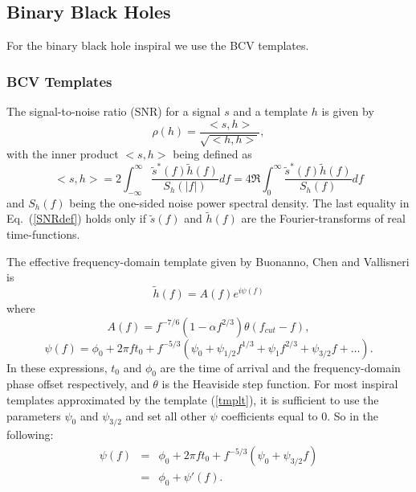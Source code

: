 \subsection*{Binary Black Holes}

For the binary black hole inspiral we use the BCV templates.

\subsubsection*{BCV Templates}
\label{BCV}

The signal-to-noise ratio (SNR) for a signal $s$ and a template $h$ is given by
\begin{equation}
\rho(h) = \frac{<s,h>}{\sqrt{<h,h>}},
\end{equation}
with the inner product $<s,h>$ being defined as
\begin{equation}
<s,h> = 2 \int_{-\infty}^{\infty} \frac{\tilde{s}^{\ast}(f) \tilde{h}(f)}
{S_h(|f|)} df =
4 \Re \int_0^{\infty} \frac{\tilde{s}^{\ast}(f) \tilde{h}(f)}{S_h(f)} df
\label{SNRdef}
\end{equation}
and $S_h(f)$ being the one-sided noise power spectral density.
The last equality in Eq.~(\ref{SNRdef}) holds only if $\tilde{s}(f)$ and
$\tilde{h}(f)$ are the Fourier-transforms of real time-functions.

The effective frequency-domain template given by Buonanno, Chen and Vallisneri
is
\begin{equation}
\tilde{h}(f) = A(f) e^{i \psi(f)}
\label{tmplt}
\end{equation}
where
\begin{equation}
A(f) = f^{-7/6} (1-\alpha f^{2/3}) \theta(f_{cut}-f),
\end{equation}
\begin{equation}
\psi(f) = \phi_0 + 2 \pi f t_0 + f^{-5/3} (\psi_0 + \psi_{1/2} f^{1/3} +
\psi_1 f^{2/3} + \psi_{3/2} f + \ldots).
\end{equation}
In these expressions, $t_0$ and $\phi_0$ are the time of arrival and the
frequency-domain phase offset respectively,
and $\theta$ is the Heaviside step function.
For most inspiral templates approximated by the template (\ref{tmplt}),
it is sufficient to use the parameters $\psi_0$ and $\psi_{3/2}$ and set all
other $\psi$ coefficients equal to 0.
So in the following:
\begin{eqnarray}
\psi(f) &=& \phi_0 + 2 \pi f t_0 + f^{-5/3} (\psi_0 + \psi_{3/2} f)\\
        &=& \phi_0 + \psi'(f) . \\
\end{eqnarray}

